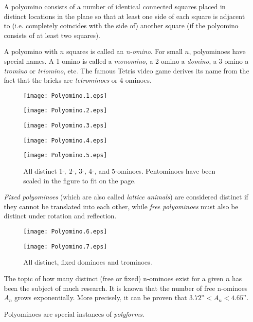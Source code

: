 \documentclass[12pt]{article}
\begin{document}
A polyomino consists of a number of identical connected squares placed
in distinct locations in the plane so that at least one side of each
square is adjacent to (i.e. completely coincides with the side of)
another square (if the polyomino consists of at least two squares).

A polyomino with $n$ squares is called an {\em n-omino}. For small $n$,
polyominoes have special names. A 1-omino is called a {\em monomino},
a 2-omino a {\em domino}, a 3-omino a {\em tromino} or {\em triomino},
etc. The famous Tetris video game derives its name from the fact that
the bricks are {\em tetrominoes} or 4-ominoes.

\begin{figure}[h]
\texttt{[image: Polyomino.1.eps]}

\texttt{[image: Polyomino.2.eps]}

\texttt{[image: Polyomino.3.eps]}

\texttt{[image: Polyomino.4.eps]}

\texttt{[image: Polyomino.5.eps]}
\sf\caption{All distinct 1-, 2-, 3-, 4-, and 5-ominoes. Pentominoes
have been scaled in the figure to fit on the page.}
\end{figure}

{\em Fixed polyominoes} (which are also called {\em lattice animals})
are considered distinct if they cannot be translated into each other,
while {\em free polyominoes} must also be distinct under rotation and
reflection.

\begin{figure}[h]
\texttt{[image: Polyomino.6.eps]}

\texttt{[image: Polyomino.7.eps]}
\sf\caption{All distinct, fixed dominoes and trominoes.}
\end{figure}

The topic of how many distinct (free or fixed) n-ominoes exist for a given
$n$ has been the subject of much research. It is known that the
number of free n-ominoes $A_n$ grows exponentially. More precisely, it
can be proven that $3.72^n < A_n < 4.65^n$.

Polyominoes are special instances of {\em polyforms}.
\end{document}
